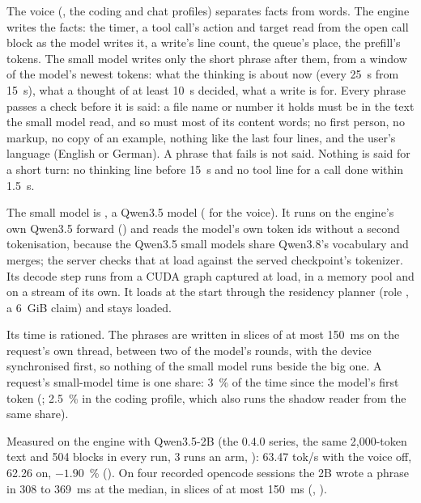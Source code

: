 The voice (, the coding and chat profiles) separates facts from words. The engine writes the facts: the timer, a tool call's action and target read from the open call block as the model writes it, a write's line count, the queue's place, the prefill's tokens. The small model writes only the short phrase after them, from a window of the model's newest tokens: what the thinking is about now (every 25~s from 15~s), what a thought of at least 10~s decided, what a write is for. Every phrase passes a check before it is said: a file name or number it holds must be in the text the small model read, and so must most of its content words; no first person, no markup, no copy of an example, nothing like the last four lines, and the user's language (English or German). A phrase that fails is not said. Nothing is said for a short turn: no thinking line before 15~s and no tool line for a call done within 1.5~s.

The small model is , a Qwen3.5 model ( for the voice). It runs on the engine's own Qwen3.5 forward () and reads the model's own token ids without a second tokenisation, because the Qwen3.5 small models share Qwen3.8's vocabulary and merges; the server checks that at load against the served checkpoint's tokenizer. Its decode step runs from a CUDA graph captured at load, in a memory pool and on a stream of its own. It loads at the start through the residency planner (role , a 6~GiB claim) and stays loaded.

Its time is rationed. The phrases are written in slices of at most 150~ms on the request's own thread, between two of the model's rounds, with the device synchronised first, so nothing of the small model runs beside the big one. A request's small-model time is one share: 3~\% of the time since the model's first token (; 2.5~\% in the coding profile, which also runs the shadow reader from the same share).

Measured on the engine with Qwen3.5-2B (the 0.4.0 series, the same 2,000-token text and 504 blocks in every run, 3 runs an arm, ): 63.47 tok/s with the voice off, 62.26 on, $-1.90$~\% (\measured). On four recorded opencode sessions the 2B wrote a phrase in 308 to 369~ms at the median, in slices of at most 150~ms (\measured, ).

